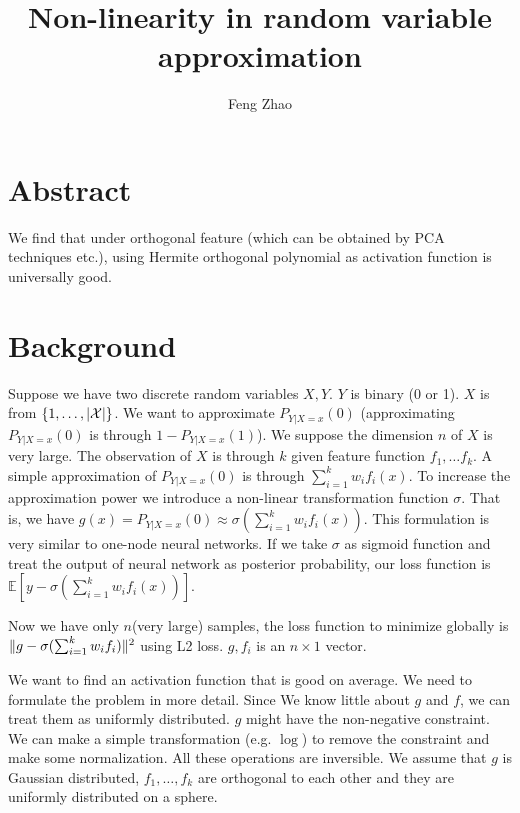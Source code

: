 \documentclass{article}
\title{Non-linearity in random variable approximation}
\author{Feng Zhao}
\DeclarePairedDelimiter\abs{\lvert}{\rvert}
\DeclarePairedDelimiter\norm{\lVert}{\rVert}
\def\E{\mathbb{E}}
\begin{document}
\maketitle
\section{Abstract}
We find that under orthogonal feature (which can be obtained by PCA techniques etc.), using Hermite orthogonal polynomial as activation function is universally good. 
\section{Background}
Suppose we have two discrete random variables $X, Y$. $Y$ is binary (0 or 1). $X$ is from $\{1, \dots, \abs{\mathcal{X}}\}$. We want to approximate $P_{Y|X=x}(0)$ (approximating $P_{Y|X=x}(0)$ is through $1-P_{Y|X=x}(1)$). We suppose the dimension $n$ of $X$ is very large. The observation of $X$ is through $k$ given feature function $f_1, \dots f_k$. 
A simple approximation of $P_{Y|X=x}(0)$ is through $ \sum_{i=1}^k w_i f_i(x)$. To increase the approximation power we introduce a non-linear transformation function $ \sigma$. That is, we have
$g(x)  = P_{Y|X=x}(0) \approx \sigma(\sum_{i=1}^k w_i f_i(x))$. This formulation is very similar to one-node neural networks. If we take $\sigma$ as sigmoid function and treat the output of neural network as
posterior probability, our loss function is $ \E[y - \sigma(\sum_{i=1}^k w_i f_i(x))]$. 

Now we have only $n$(very large) samples, the loss function to minimize globally is
$\norm{g - \sigma(\sum_{i=1}^k w_i f_i)}^2$ using L2 loss. 
$g, f_i$ is an $n\times 1 $ vector.

We want to find an activation function that is good on average. We need to formulate the problem in more detail. Since We know little about $g$ and $f$, we can treat them as uniformly distributed. $g$ might have the non-negative constraint. We can make a simple transformation (e.g. $\log$) to remove the constraint and make some normalization. All these operations are inversible. We assume that $g$ is Gaussian distributed, $f_1, \dots, f_k$ are orthogonal to each other and they are uniformly distributed on a sphere.
\end{document}

